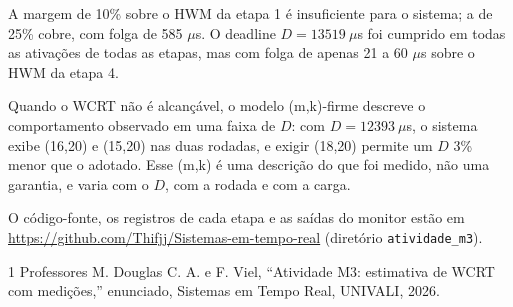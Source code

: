 \documentclass[conference,a4paper]{IEEEtran}
\begin{document}
A margem de 10\% sobre o HWM da etapa 1 é insuficiente para o sistema; a de 25\% cobre, com folga de 585 $\mu$s. O deadline $D = 13519\ \mu$s foi cumprido em todas as ativações de todas as etapas, mas com folga de apenas 21 a 60 $\mu$s sobre o HWM da etapa 4.

Quando o WCRT não é alcançável, o modelo (m,k)-firme descreve o comportamento observado em uma faixa de $D$: com $D = 12393\ \mu$s, o sistema exibe (16,20) e (15,20) nas duas rodadas, e exigir (18,20) permite um $D$ 3\% menor que o adotado. Esse (m,k) é uma descrição do que foi medido, não uma garantia, e varia com o $D$, com a rodada e com a carga.

O código-fonte, os registros de cada etapa e as saídas do monitor estão em \url{https://github.com/Thifjj/Sistemas-em-tempo-real} (diretório \texttt{atividade\_m3}).

\begin{thebibliography}{1}
 Professores M. Douglas C. A. e F. Viel, ``Atividade M3: estimativa de WCRT com medições,'' enunciado, Sistemas em Tempo Real, UNIVALI, 2026.
\end{thebibliography}
\end{document}
